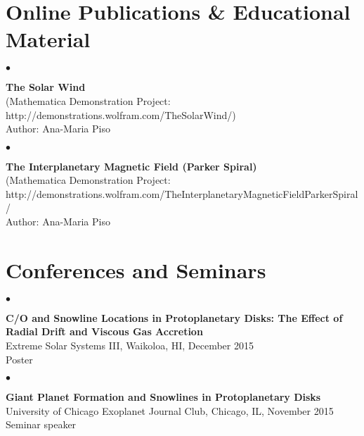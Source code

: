 \documentclass[margin,line]{res}
\newenvironment{list2}{
  \begin{list}{$\bullet$}{%
      \setlength{\itemsep}{0in}
      \setlength{\parsep}{0in} \setlength{\parskip}{0in}
      \setlength{\topsep}{0in} \setlength{\partopsep}{0in} 
      \setlength{\leftmargin}{0.2in}}}{\end{list}}
\begin{document}
\begin{resume}

\section{\sc Online Publications \& Educational Material}

\begin{list2}
\item[] {\bf The Solar Wind} \\
(Mathematica Demonstration Project: http://demonstrations.wolfram.com/TheSolarWind/) \\
Author: Ana-Maria Piso \\
\end{list2}

\vspace*{-.13in}
\begin{list2}
\item[] {\bf The Interplanetary Magnetic Field (Parker Spiral)} \\
(Mathematica Demonstration Project: \\
http://demonstrations.wolfram.com/TheInterplanetaryMagneticFieldParkerSpiral/ \\
Author: Ana-Maria Piso \\
\end{list2}


\section{\sc Conferences and Seminars}

\begin{list2}
\item[] {\bf C/O and Snowline Locations in Protoplanetary Disks: The Effect of Radial Drift and Viscous Gas Accretion} \\
Extreme Solar Systems III, Waikoloa, HI, December 2015 \\
Poster \\
\end{list2}

\begin{list2}
\item[] {\bf Giant Planet Formation and Snowlines in Protoplanetary Disks} \\
University of Chicago Exoplanet Journal Club, Chicago, IL, November 2015 \\
Seminar speaker \\
\end{list2}


\end{resume}
\end{document}
